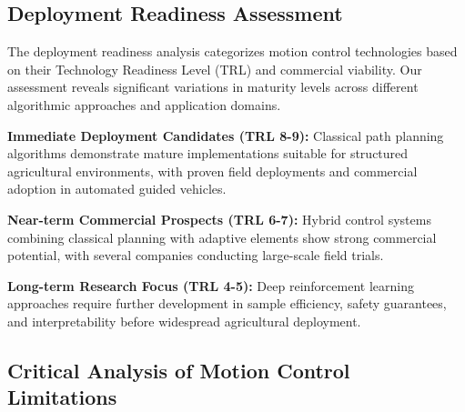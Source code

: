 \subsection{Deployment Readiness Assessment}
\label{subsec:motion_deployment_readiness}


The deployment readiness analysis categorizes motion control technologies based on their Technology Readiness Level (TRL) and commercial viability. Our assessment reveals significant variations in maturity levels across different algorithmic approaches and application domains.

\textbf{Immediate Deployment Candidates (TRL 8-9):}
Classical path planning algorithms demonstrate mature implementations suitable for structured agricultural environments, with proven field deployments and commercial adoption in automated guided vehicles.

\textbf{Near-term Commercial Prospects (TRL 6-7):}
Hybrid control systems combining classical planning with adaptive elements show strong commercial potential, with several companies conducting large-scale field trials.

\textbf{Long-term Research Focus (TRL 4-5):}
Deep reinforcement learning approaches require further development in sample efficiency, safety guarantees, and interpretability before widespread agricultural deployment.

\subsection{Critical Analysis of Motion Control Limitations}
\label{subsec:motion_critical_analysis}


